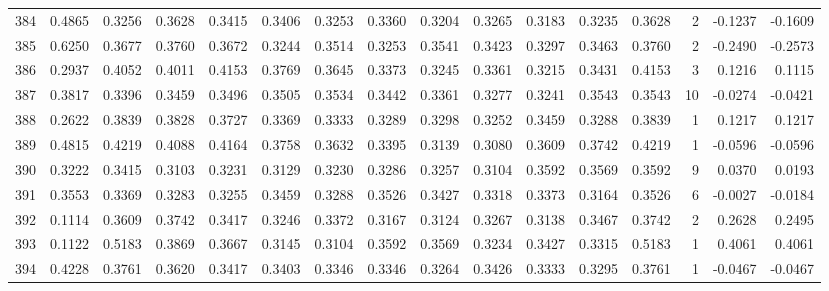 \begin{tabular}{lrrrrrrrrrrrrrrr}
384 &      0.4865 &  0.3256 &  0.3628 &  0.3415 &  0.3406 &  0.3253 &  0.3360 &  0.3204 &  0.3265 &  0.3183 &   0.3235 &     0.3628 &      2 &                   -0.1237 &                    -0.1609 \\
385 &      0.6250 &  0.3677 &  0.3760 &  0.3672 &  0.3244 &  0.3514 &  0.3253 &  0.3541 &  0.3423 &  0.3297 &   0.3463 &     0.3760 &      2 &                   -0.2490 &                    -0.2573 \\
386 &      0.2937 &  0.4052 &  0.4011 &  0.4153 &  0.3769 &  0.3645 &  0.3373 &  0.3245 &  0.3361 &  0.3215 &   0.3431 &     0.4153 &      3 &                    0.1216 &                     0.1115 \\
387 &      0.3817 &  0.3396 &  0.3459 &  0.3496 &  0.3505 &  0.3534 &  0.3442 &  0.3361 &  0.3277 &  0.3241 &   0.3543 &     0.3543 &     10 &                   -0.0274 &                    -0.0421 \\
388 &      0.2622 &  0.3839 &  0.3828 &  0.3727 &  0.3369 &  0.3333 &  0.3289 &  0.3298 &  0.3252 &  0.3459 &   0.3288 &     0.3839 &      1 &                    0.1217 &                     0.1217 \\
389 &      0.4815 &  0.4219 &  0.4088 &  0.4164 &  0.3758 &  0.3632 &  0.3395 &  0.3139 &  0.3080 &  0.3609 &   0.3742 &     0.4219 &      1 &                   -0.0596 &                    -0.0596 \\
390 &      0.3222 &  0.3415 &  0.3103 &  0.3231 &  0.3129 &  0.3230 &  0.3286 &  0.3257 &  0.3104 &  0.3592 &   0.3569 &     0.3592 &      9 &                    0.0370 &                     0.0193 \\
391 &      0.3553 &  0.3369 &  0.3283 &  0.3255 &  0.3459 &  0.3288 &  0.3526 &  0.3427 &  0.3318 &  0.3373 &   0.3164 &     0.3526 &      6 &                   -0.0027 &                    -0.0184 \\
392 &      0.1114 &  0.3609 &  0.3742 &  0.3417 &  0.3246 &  0.3372 &  0.3167 &  0.3124 &  0.3267 &  0.3138 &   0.3467 &     0.3742 &      2 &                    0.2628 &                     0.2495 \\
393 &      0.1122 &  0.5183 &  0.3869 &  0.3667 &  0.3145 &  0.3104 &  0.3592 &  0.3569 &  0.3234 &  0.3427 &   0.3315 &     0.5183 &      1 &                    0.4061 &                     0.4061 \\
394 &      0.4228 &  0.3761 &  0.3620 &  0.3417 &  0.3403 &  0.3346 &  0.3346 &  0.3264 &  0.3426 &  0.3333 &   0.3295 &     0.3761 &      1 &                   -0.0467 &                    -0.0467 \\

\end{tabular}
